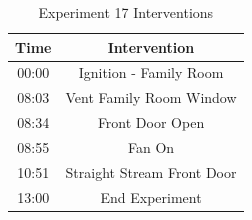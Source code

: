\documentclass{article}
\begin{document}
\begin{table}[H]
	\centering
	\caption{Experiment 17 Interventions}
	\begin{tabular}{|c|c|} 
		\hline
		Time & Intervention \\ \hline \hline
		00:00 & Ignition - Family Room \\ \hline
		08:03 & Vent Family Room Window\\ \hline
		08:34 & Front Door Open \\ \hline
		08:55 & Fan On \\ \hline
		10:51 & Straight Stream Front Door \\ \hline
		13:00 & End Experiment \\ \hline
	\end{tabular}
	\label{Table:Exp17Interventions}
\end{table}

\clearpage
\end{document}
